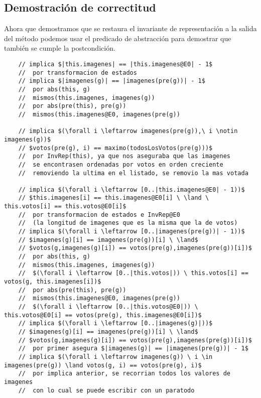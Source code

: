 \documentclass[10pt,a4paper,spanish]{article}
\begin{document}
\newpage

\subsection{Demostración de correctitud}

\begin{paragraph}{}
Ahora que demostramos que se restaura el invariante de representación a la
salida del método podemos usar el predicado de abstracción para demostrar que
también se cumple la postcondición.
\end{paragraph}

\begin{lstlisting}
	// implica $|this.imagenes| == |this.imagenes@E0| - 1$
	// 	por transformacion de estados
	// implica $|imagenes(g)| == |imagenes(pre(g))| - 1$
	//	por abs(this, g) 
	//	mismos(this.imagenes, imagenes(g))
	//	por abs(pre(this), pre(g))
	//	mismos(this.imagenes@E0, imagenes(pre(g))

	// implica $(\forall i \leftarrow imagenes(pre(g)),\ i \notin imagenes(g))$
	// $votos(pre(g), i) == maximo(todosLosVotos(pre(g)))$
	//	por InvRep(this), ya que nos aseguraba que las imagenes
	//	se encontrasen ordenadas por votos en orden creciente
	//	removiendo la ultima en el listado, se removio la mas votada

	// implica $(\forall i \leftarrow [0..|this.imagenes@E0| - 1))$
	// $this.imagenes[i] == this.imagenes@E0[i] \ \land \ this.votos[i] == this.votos@E0[i]$
	//	por transformacion de estados e InvRep@E0
	//	(la longitud de imagenes que es la misma que la de votos)
	// implica $(\forall i \leftarrow [0..|imagenes(pre(g))| - 1))$
	// $imagenes(g)[i] == imagenes(pre(g))[i] \ \land$
	// $votos(g,imagenes(g)[i]) == votos(pre(g),imagenes(pre(g))[i])$
	//	por abs(this, g) 
	//	mismos(this.imagenes, imagenes(g))
	// 	$(\forall i \leftarrow [0..|this.votos|)) \ this.votos[i] == votos(g, this.imagenes[i])$
	//	por abs(pre(this), pre(g))
	//	mismos(this.imagenes@E0, imagenes(pre(g))
	// 	$(\forall i \leftarrow [0..|this.votos@E0|)) \ this.votos@E0[i] == votos(pre(g), this.imagenes@E0[i])$
	// implica $(\forall i \leftarrow [0..|imagenes(g)|))$
	// $imagenes(g)[i] == imagenes(pre(g))[i] \ \land$
	// $votos(g,imagenes(g)[i]) == votos(pre(g),imagenes(pre(g))[i])$
	//	por primer asegura $|imagenes(g)| == |imagenes(pre(g))| - 1$
	// implica $(\forall i \leftarrow imagenes(g)) \ i \in imagenes(pre(g)) \land votos(g, i) == votos(pre(g), i)$
	//	por implica anterior, se recorrian todos los valores de imagenes
	//	con lo cual se puede escribir con un paratodo
\end{lstlisting}
\end{document}
